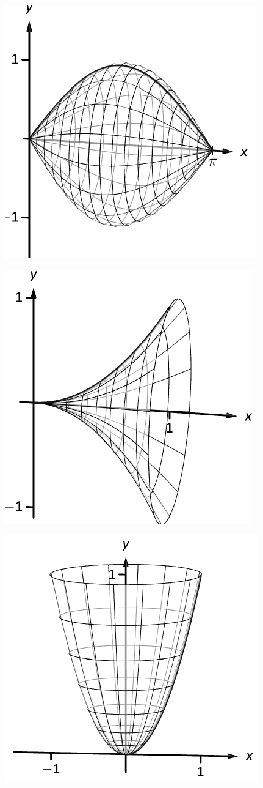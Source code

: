 \documentclass[10pt]{article}
\begin{document}
\includegraphics{figsa1_3DBW.pdf}
\texttt{}

\includegraphics{figsa2a_3DBW.pdf}
\texttt{}

\includegraphics{figsa2b_3DBW.pdf}
\texttt{}
\end{document}
